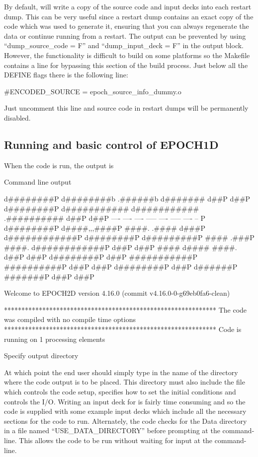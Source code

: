 By default, {\EPOCH} will write a copy of the source code and input decks
into each restart dump. This can be very useful since a restart dump contains
an exact copy of the code which was used to generate it, ensuring that you
can always regenerate the data or continue running from a restart.
The output can be prevented by using ``dump\_source\_code = F'' and
``dump\_input\_deck = F'' in the output block.
However, the functionality is difficult to build on some platforms so
the Makefile contains a line for bypassing this section of the build
process. Just below all the DEFINE flags there is the following line:
\begin{boxverbatim}
#ENCODED_SOURCE = epoch_source_info_dummy.o
\end{boxverbatim}
Just uncomment this line and source code in restart dumps will be permanently
disabled.


\subsection{\texorpdfstring
  {Running {\EPOCH} and basic control of EPOCH1D}
  {Running {EPOCH} and basic control of EPOCH1D}}
When the code is run, the output is
{\samepage
\begin{lboxverbatim}{Command line output}

        d########P  d########b        .######b          d#######  d##P      d##P
       d########P  d###########    d###########     .##########  d##P      d##P
      ----        ----     ----  -----     ----   -----         ----      -- P
     d########P  d####,,,####P ####.      .#### d###P          d############P
    d########P  d#########P   ####       .###P ####.          d############P
   d##P        d##P           ####     d####   ####.         d##P      d##P
  d########P  d##P            ###########P     ##########P  d##P      d##P
 d########P  d##P              d######P          #######P  d##P      d##P

 Welcome to EPOCH2D version 4.16.0   (commit v4.16.0-0-g69eb0fa6-clean)

 *************************************************************
 The code was compiled with no compile time options
 *************************************************************
 Code is running on 1 processing elements

 Specify output directory
\end{lboxverbatim}
}

At which point the end user should simply type in the name of the directory
where the code output is to be placed. This directory must also include the
file  which controls the code setup, specifies how to set the
initial conditions and controls the I/O. Writing an input deck for {\EPOCH} is
fairly time consuming and so the code is supplied with some example input decks
which include all the necessary sections for the code to run. Alternately, the
code checks for the Data directory in a file named ``USE\_DATA\_DIRECTORY''
before prompting at the command-line. This allows the code to be run without
waiting for input at the command-line.


